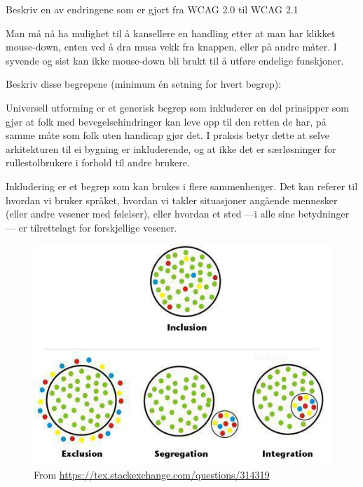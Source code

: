 \documentclass{../../myassignment}
\begin{document}
	\begin{problem}
		Beskriv en av endringene som er gjort fra WCAG 2.0 til WCAG 2.1
	\end{problem}
	\begin{answer}
		Man må nå ha mulighet til å kansellere en handling etter at man har klikket mouse-down, enten ved å dra musa vekk fra knappen, eller på andre måter. I syvende og sist kan ikke mouse-down bli brukt til å utføre endelige funskjoner. 
		
	\end{answer}

	\newpage

	\begin{problem}
		Beskriv disse begrepene (minimum én setning for hvert begrep):
	\end{problem}
	\begin{answer}
		\begin{description}[style=nextline]
			\item [Universell utforming]  Universell utforming er et generisk begrep som inkluderer en del prinsipper som gjør at folk med bevegelsehindringer kan leve opp til den retten de har, på samme måte som folk uten handicap gjør det. I praksis betyr dette at selve arkitekturen til ei bygning er inkluderende, og at ikke det er særløsninger for rullestolbrukere i forhold til andre brukere.

			\item [Inkludering] Inkludering er et begrep som kan brukes i flere sammenhenger. Det kan referer til hvordan vi bruker språket, hvordan vi takler situasjoner angående mennesker (eller andre vesener med følelser), eller hvordan et sted ---i alle sine betydninger--- er tilrettelagt for forskjellige vesener.

			\begin{figure}[h]\begin{center}
					\includegraphics[scale=0.6]{inclusion.jpg}
					\caption{From \url{https://tex.stackexchange.com/questions/314319}}
			\end{center}\end{figure}


\end{description}
\end{answer}
\end{document}
